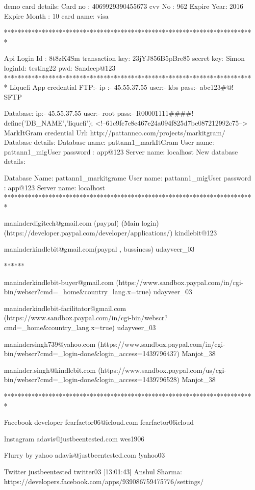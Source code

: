 demo card details:
Card no : 4069929390455673
cvv No : 962
Expire Year: 2016
Expire Month : 10
card name: visa

*************************************************************************

Api Login Id : 8t8zK4Sm
transaction key: 23jYJ856B5pBre85
secret key: Simon
loginId: testing22
pwd: Sandeep@123
*************************************************************************
Liquefi App credential
FTP:-
ip :- 45.55.37.55
user:- kbs
pass:- abc123#@!
SFTP

Database:
ip:- 45.55.37.55
user:- root
pass:- R00001111####!
define('DB_NAME','liquefi');
<!--61c9fc7e8c467e24a094f825d7be087212992c75-->
MarkItGram credential
Url: http://pattannco.com/projects/markitgram/
Database details:
 Database name: pattann1_markItGram
 User name: pattann1_migUser
 password : app@123
 Server name: localhost
 New database details:

Database Name: pattann1_markitgrame
User name: pattann1_migUser
password : app@123
Server name: localhost
*************************************************************************

maninderdigitech@gmail.com (paypal)    (Main login)(https://developer.paypal.com/developer/applications/)
kindlebit@123

maninderkindlebit@gmail.com(paypal , bussiness)
udayveer_03

******

maninderkindlebit-buyer@gmail.com (https://www.sandbox.paypal.com/in/cgi-bin/webscr?cmd=_home&country_lang.x=true)
udayveer_03


maninderkindlebit-facilitator@gmail.com (https://www.sandbox.paypal.com/in/cgi-bin/webscr?cmd=_home&country_lang.x=true)
udayveer_03 


manindersingh739@yahoo.com  (https://www.sandbox.paypal.com/in/cgi-bin/webscr?cmd=_login-done&login_access=1439796437)
Manjot_38


maninder.singh@kindlebit.com (https://www.sandbox.paypal.com/us/cgi-bin/webscr?cmd=_login-done&login_access=1439796528)
Manjot_38

*************************************************************************

Facebook developer
fearfactor06@icloud.com
fearfactor06icloud
 
Instagram
adavis@justbeentested.com
wes1906
 
Flurry by yahoo
adavis@justbeentested.com
 !yahoo03
 
Twitter
justbeentested
 twitter03
[13:01:43] Anshul Sharma: https://developers.facebook.com/apps/939086759475776/settings/


